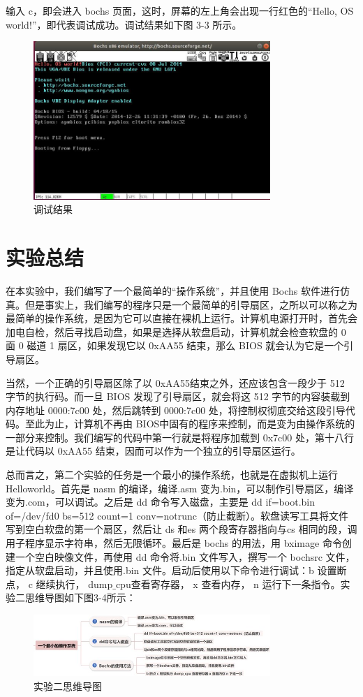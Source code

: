 输入 c，即会进入 bochs 页面，这时，屏幕的左上角会出现一行红色的“Hello, OS world!”，即代表调试成功。调试结果如下图 3-3 所示。
\begin{figure}[H]
  \centering
  \includegraphics[width=0.8\textwidth]{figures/chapter3/3-3.jpg}
  \caption{调试结果}
  \label{fig:3}
\end{figure}

\section{实验总结}
在本实验中，我们编写了一个最简单的“操作系统”，并且使用 Bochs 软件进行仿真。但是事实上，我们编写的程序只是一个最简单的引导扇区，之所以可以称之为最简单的操作系统，是因为它可以直接在裸机上运行。计算机电源打开时，首先会加电自检，然后寻找启动盘，如果是选择从软盘启动，计算机就会检查软盘的 0 面 0 磁道 1 扇区，如果发现它以 0xAA55 结束，那么 BIOS 就会认为它是一个引导扇区。\par
当然，一个正确的引导扇区除了以 0xAA55结束之外，还应该包含一段少于 512 字节的执行码。而一旦 BIOS 发现了引导扇区，就会将这 512 字节的内容装载到内存地址 0000:7c00 处，然后跳转到 0000:7c00 处，将控制权彻底交给这段引导代码。至此为止，计算机不再由 BIOS中固有的程序来控制，而是变为由操作系统的一部分来控制。我们编写的代码中第一行就是将程序加载到 0x7c00 处，第十八行是让代码以 0xAA55 结束，因而可以作为一个独立的引导扇区运行。\par
总而言之，第二个实验的任务是一个最小的操作系统，也就是在虚拟机上运行 Helloworld。首先是 nasm 的编译，编译.asm 变为.bin，可以制作引导扇区，编译变为.com，可以调试。之后是 dd 命令写入磁盘，主要是 dd if=boot.bin of=/dev/fd0 bs=512 count=1 conv=notrunc（防止截断）。软盘读写工具将文件写到空白软盘的第一个扇区，然后让 ds 和es 两个段寄存器指向与cs 相同的段，调用子程序显示字符串，然后无限循环。最后是 bochs 的用法，用 bximage 命令创建一个空白映像文件，再使用 dd 命令将.bin 文件写入，撰写一个 bochsrc 文件，指定从软盘启动，并且使用.bin 文件。启动后使用以下命令进行调试：b 设置断点， c 继续执行， dump$\_$cpu查看寄存器， x 查看内存， n 运行下一条指令。实验二思维导图如下图3-4所示：
\begin{figure}[H]
  \centering
  \includegraphics[width=0.8\textwidth]{figures/chapter3/3-4.jpg}
  \caption{实验二思维导图}
  \label{fig:3}
\end{figure}

 \vfill